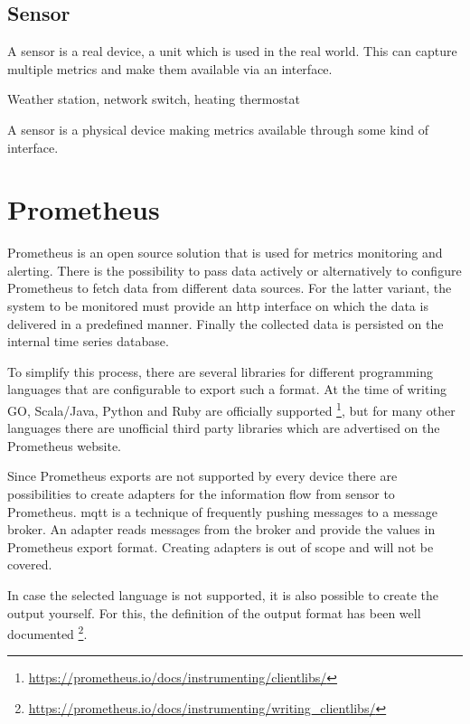 \subsection{Sensor}

A sensor is a real device, a unit which is used in the real world. This can capture multiple metrics and make them available via an interface.

\begin{Beispiel}
	Weather station, network switch, heating thermostat
\end{Beispiel}

\begin{Definition}
	A sensor is a physical device making metrics available through some kind of interface.
\end{Definition}

\section{Prometheus}

Prometheus is an open source solution that is used for metrics monitoring and alerting. There is the possibility to pass data actively or alternatively to configure Prometheus to fetch data from different data sources. For the latter variant, the system to be monitored must provide an \gls{http} interface on which the data is delivered in a predefined manner. Finally the collected data is persisted on the internal time series database.

To simplify this process, there are several libraries for different programming languages that are configurable to export such a format. At the time of writing GO, Scala/Java, Python and Ruby are officially supported \footnote{\url{https://prometheus.io/docs/instrumenting/clientlibs/}}, but for many other languages there are unofficial third party libraries which are advertised on the Prometheus website. 

Since Prometheus exports are not supported by every device there are possibilities to create adapters for the information flow from sensor to Prometheus. \gls{mqtt} is a technique of frequently pushing messages to a message broker. An adapter reads messages from the broker and provide the values in Prometheus export format. Creating adapters is out of scope and will not be covered.

In case the selected language is not supported, it is also possible to create the output yourself. For this, the definition of the output format has been well documented \footnote{\url{https://prometheus.io/docs/instrumenting/writing_clientlibs/}}.

